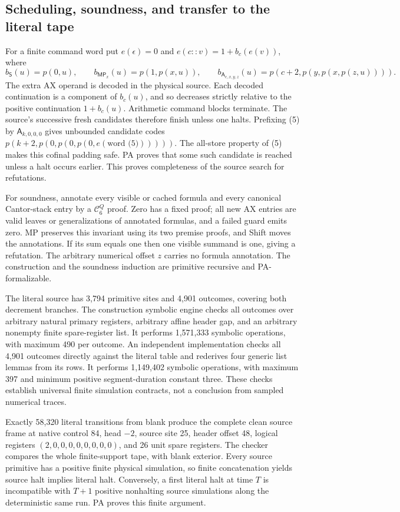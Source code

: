 \subsection{Scheduling, soundness, and transfer to the literal tape}

For a finite command word put $e(\epsilon)=0$ and
$e(c::v)=1+b_c(e(v))$, where
\[
 b_{\mathsf S}(u)=p(0,u),\qquad
 b_{\mathsf{MP}_x}(u)=p(1,p(x,u)),\qquad
 b_{\mathsf A_{c,x,y,z}}(u)=p(c+2,p(y,p(x,p(z,u)))).
\]
The extra AX operand is decoded in the physical source. Each decoded
continuation is a component of $b_c(u)$, and so decreases strictly
relative to the positive continuation $1+b_c(u)$. Arithmetic command
blocks terminate. The source's successive fresh candidates therefore
finish unless one halts. Prefixing (5) by
$\mathsf A_{k,0,0,0}$ gives unbounded candidate codes
$p(k+2,p(0,p(0,p(0,e(\text{word (5)})))))$.
The all-store property of (5) makes this cofinal padding safe.
PA proves that some such candidate is reached unless a halt occurs
earlier. This proves completeness of the source search for refutations.

For soundness, annotate every visible or cached formula and every
canonical Cantor-stack entry by a $\mathcal C_6^Q$ proof. Zero has a
fixed proof; all new AX entries are valid leaves or generalizations of
annotated formulas, and a failed guard emits zero. MP preserves this
invariant using its two premise proofs, and Shift moves the annotations.
If its sum equals one then one visible summand is one, giving a
refutation. The arbitrary numerical offset $z$ carries no formula
annotation. The construction and the soundness induction are primitive
recursive and PA-formalizable.

The literal source has 3,794 primitive sites and 4,901 outcomes, covering
both decrement branches. The construction symbolic engine checks all
outcomes over arbitrary natural primary registers, arbitrary affine
header gap, and an arbitrary nonempty finite spare-register list.
It performs 1,571,333 symbolic operations, with maximum 490 per outcome.
An independent implementation checks all 4,901 outcomes directly against
the literal table and rederives four generic list lemmas from its rows.
It performs 1,149,402 symbolic operations, with maximum 397 and minimum
positive segment-duration constant three. These checks
establish universal finite simulation contracts, not a conclusion from
sampled numerical traces.

Exactly 58,320 literal transitions from blank produce the complete
clean source frame at native control 84, head $-2$, source site 25,
header offset 48, logical registers $(2,0,0,0,0,0,0,0,0)$, and 26 unit spare
registers. The checker compares the whole finite-support tape, with
blank exterior. Every source primitive has a positive finite physical
simulation, so finite concatenation yields source halt implies literal
halt. Conversely, a first literal halt at time $T$ is incompatible with
$T+1$ positive nonhalting source simulations along the deterministic
same run. PA proves this finite argument.

